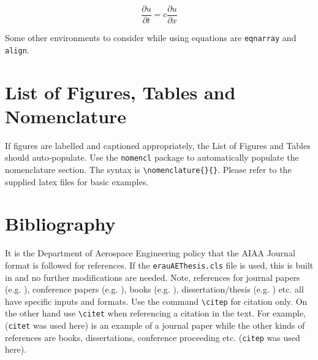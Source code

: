 \begin{equation}
    \frac{\partial u}{\partial t} = c\frac{\partial u}{\partial x}
\end{equation}

Some other environments to consider while using equations are \verb|eqnarray| and \verb|align|.
\section{List of Figures, Tables and Nomenclature}
If figures are labelled and captioned appropriately, the List of Figures and Tables should auto-populate. Use the \verb|nomencl| package to automatically populate the nomenclature section. The syntax is \verb|\nomenclature{}{}|. Please refer to the supplied latex files for basic examples. 

\section{Bibliography}
It is the Department of Aerospace Engineering policy that the AIAA Journal format is followed for references. If the \verb|erauAEThesis.cls| file is used, this is built in and no further modifications are needed. Note, references for journal papers (e.g. \citet{Adrian2007a}), conference papers (e.g. \citet{Thompson1989a} ), books (e.g. \citet{Panton2013a}), dissertation/thesis (e.g. \citet{Tseng1983a}) etc. all have specific inputs and formats. Use the command \verb|\citep| for citation only. On the other hand use \verb|\citet| when referencing a citation in the text. For example, \citet{Adrian2007a} (\verb|citet| was used here) is an example of a journal paper while the other kinds of references are books, dissertations, conference proceeding etc. \citep{Panton2013a,Tseng1983a,Thompson1989a} (\verb|citep| was used here).



